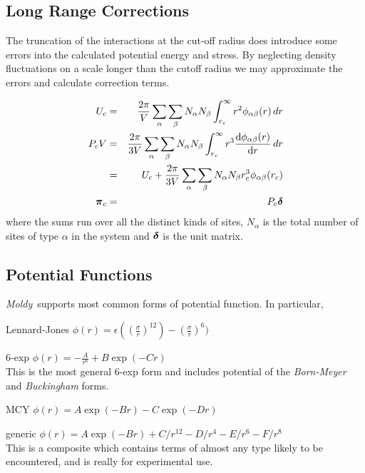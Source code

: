 \documentclass[twoside]{report}
\newcommand{\moldy}{{\em Moldy}}
\newcommand{\bm}[1]{\mbox{\boldmath \protect\(#1\protect\)}}
\begin{document}
\subsection{Long Range Corrections}
The truncation of the interactions at the cut-off radius does
introduce some errors into the calculated potential energy and stress.
By neglecting density fluctuations on a scale longer than the cutoff
radius we may approximate the errors and calculate correction 
terms\cite[pp 64-65]{allen:87}.

\begin{eqnarray}
U_c & = & \frac{2\pi}{V} \sum_\alpha \sum_\beta N_\alpha N_\beta 
               \int_{r_c}^\infty r^2 \phi_{\alpha\beta}(r) \, dr \\
P_c V & = & \frac{2\pi}{3 V} \sum_\alpha \sum_\beta N_\alpha N_\beta 
               \int_{r_c}^\infty r^3 
               \frac{\mbox{d}\phi_{\alpha\beta}(r)}{\mbox{d}r}
                \, dr \nonumber \\ 
           & = & U_c + \frac{2\pi}{3 V} \sum_\alpha \sum_\beta
           N_\alpha N_\beta r_c^3 \phi_{\alpha\beta}(r_c) \\
\bm{\pi}_c & = & P_c \bm{\delta}
\end{eqnarray}
where the sums run over all the distinct kinds of sites,
$N_\alpha$ is the total number of sites of type $\alpha$ in the system
and $\bm{\delta}$ is the unit matrix.


\subsection{Potential Functions}
\moldy\ supports most common forms of potential function.  In
particular, 
\begin{list}{}{  \leftmargin=1.5in \parsep=0in
\renewcommand{\makelabel}[1]{\em #1 \hfil}}
\item[Lennard-Jones] $\phi(r) = \epsilon((\frac{\sigma}{r})^{12}) -
(\frac{\sigma}{r})^{6})$
\item[6-exp] $\phi(r) = -\frac{A}{r^{6}} +
B\exp(-Cr)$\\
This is the most general 6-exp form and
includes potential of the {\em Born-Meyer\/} and {\em Buckingham\/} forms.
\item[MCY] $\phi(r) = A \exp(-Br) - C \exp(-Dr)$
\item[generic]  $\phi(r) = A \exp(-Br) + C/r^{12} - D/r^4 -E/r^6 -F/r^8$\\
This is a composite which contains terms of almost any
type likely to be encountered, and is really for experimental use.
\end{list}
\end{document}
